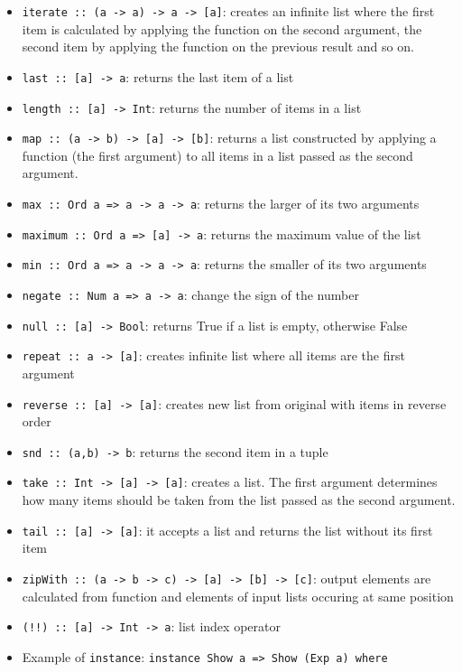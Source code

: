 \documentclass[11pt]{scrartcl}
\begin{document}
\begin{itemize}
    \item \texttt{iterate :: (a -> a) -> a -> [a]}: creates an infinite list where the first 
    item is calculated by applying the function on the second argument, the second item by 
    applying the function on the previous result and so on.
    \item \texttt{last :: [a] -> a}: returns the last item of a list
    \item \texttt{length :: [a] -> Int}: returns the number of items in a list
    \item \texttt{map :: (a -> b) -> [a] -> [b]}: returns a list constructed by applying a 
    function (the first argument) to all items in a list passed as the second argument.
    \item \texttt{max :: Ord a => a -> a -> a}: returns the larger of its two arguments
    \item \texttt{maximum :: Ord a => [a] -> a}: returns the maximum value of the list
    \item \texttt{min :: Ord a => a -> a -> a}: returns the smaller of its two arguments
    \item \texttt{negate :: Num a => a -> a}: change the sign of the number
    \item \texttt{null :: [a] -> Bool}: returns True if a list is empty, otherwise False
    \item \texttt{repeat :: a -> [a]}: creates infinite list where all items are the 
    first argument
    \item \texttt{reverse :: [a] -> [a]}: creates new list from original with items in 
    reverse order
    \item \texttt{snd :: (a,b) -> b}: returns the second item in a tuple
    \item \texttt{take :: Int -> [a] -> [a]}: creates a list. The first argument determines 
    how many items should be taken from the list passed as the second argument.
    \item \texttt{tail :: [a] -> [a]}: it accepts a list and returns the list without its first
    item
    \item \texttt{zipWith :: (a -> b -> c) -> [a] -> [b] -> [c]}: output elements are 
    calculated from function and elements of input lists occuring at same position
    \item \texttt{(!!) :: [a] -> Int -> a}: list index operator
    \item Example of \texttt{instance}: \texttt{instance Show a => Show (Exp a) where}
\end{itemize}
\end{document}
